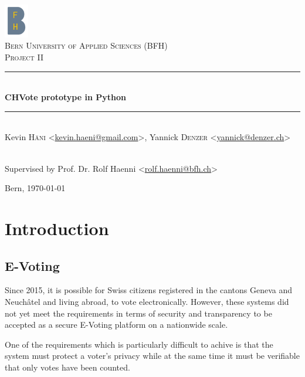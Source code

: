 \documentclass[a4paper,12pt]{report}
\begin{document}

\begin{titlepage}
\begin{center}
	\includegraphics[width=0.08\textwidth]{images/bfh_logo.png}\\[1cm]
	\textsc{\LARGE Bern University of Applied Sciences (BFH)}\\[1.5cm]
	\textsc{\Large Project II}\\[0.5cm]

	\newcommand{\HRule}{\rule{\linewidth}{0.3mm}}
	\HRule \\[0.4cm]
	{\huge \bfseries CHVote prototype in Python} \\[0.3cm]
	\HRule \\[1.5cm]

	Kevin \textsc{Häni} <\href{mailto:kevin.haeni@gmail.com}{kevin.haeni@gmail.com}>,
	Yannick \textsc{Denzer} <\href{mailto:yannick@denzer.ch}{yannick@denzer.ch}>

	\\[1.5cm]

	Supervised by Prof. Dr. Rolf Haenni <\href{mailto:rolf.haenni@bfh.ch}{rolf.haenni@bfh.ch}>

	\vfill

	Bern, {\large \today}
\end{center}
\end{titlepage}

\clearpage
\tableofcontents


\clearpage
\chapter{Introduction}
\section{E-Voting}
Since 2015, it is possible for Swiss citizens registered in the cantons Geneva and Neuchâtel and living abroad, to vote electronically. However, these systems did not yet meet the requirements in terms of security and transparency to be accepted as a secure E-Voting platform on a nationwide scale.

One of the requirements which is particularly difficult to achive is that the system must protect a voter's privacy while at the same time it must be verifiable that only votes have been counted.
\end{document}
